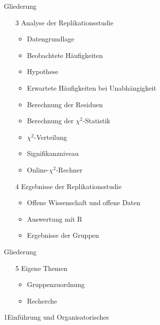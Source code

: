 \documentclass[xcolor=table,9pt,aspectratio=169]{beamer}
\begin{document}
\begin{frame}{\vspace*{10mm}Gliederung}
\begin{itemize}
   \item[3] Analyse der Replikationsstudie
   \begin{itemize}
      \item Datengrundlage
      \item Beobachtete Häufigkeiten
      \item Hypothese
      \item Erwartete Häufigkeiten bei Unabhängigkeit
      \item Berechnung der Residuen
      \item Berechnung der $\chi^{2}$-Statistik
      \item $\chi^2$-Verteilung
      \item Signifikanzniveau
      \item Online-$\chi^2$-Rechner
   \end{itemize}
   \item[4] Ergebnisse der Replikationsstudie
   \begin{itemize}
      \item Offene Wissenschaft und offene Daten
      \item Auswertung mit R
      \item Ergebnisse der Gruppen
   \end{itemize}
\end{itemize}
\end{frame}


\begin{frame}{\vspace*{10mm}Gliederung}
\begin{itemize}
   \item[5] Eigene Themen
   \begin{itemize}
      \item Gruppenzuordnung
      \item Recherche
   \end{itemize}
\end{itemize}
\end{frame}


\begin{frame}
\begin{overlayarea}{\textwidth}{0.81\paperheight}{
   \vspace*{11mm}
   \textcolor{uolblue}
   {1\hspace*{1em}Einführung und Organisatorisches}
}
\end{overlayarea}
\end{frame}
\end{document}
